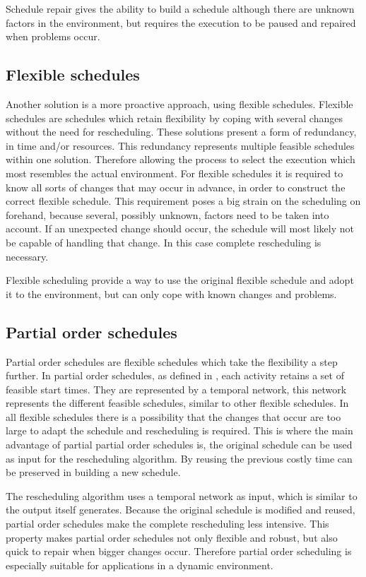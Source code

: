 \documentclass{article}
\begin{document}
Schedule repair gives the ability to build a schedule although there are unknown factors in the environment, but requires the execution to be paused and repaired when problems occur.

\subsection{Flexible schedules}
Another solution is a more proactive approach, using flexible schedules.
Flexible schedules are schedules which retain flexibility by coping with several changes without the need for rescheduling.
These solutions present a form of redundancy, in time and/or resources.
This redundancy represents multiple feasible schedules within one solution.
Therefore allowing the process to select the execution which most resembles the actual environment.
For flexible schedules it is required to know all sorts of changes that may occur in advance, in order to construct the correct flexible schedule.
This requirement poses a big strain on the scheduling on forehand, because several, possibly unknown, factors need to be taken into account.
If an unexpected change should occur, the schedule will most likely not be capable of handling that change.
In this case complete rescheduling is necessary.

Flexible scheduling provide a way to use the original flexible schedule and adopt it to the environment, but can only cope with known changes and problems.

\subsection{Partial order schedules}
Partial order schedules are flexible schedules which take the flexibility a step further.
In partial order schedules, as defined in \citet{policella07}, each activity retains a set of feasible start times.
They are represented by a temporal network, this network represents the different feasible schedules, similar to other flexible schedules.
In all flexible schedules there is a possibility that the changes that occur are too large to adapt the schedule and rescheduling is required.
This is where the main advantage of partial partial order schedules is, the original schedule can be used as input for the rescheduling algorithm.
By reusing the previous costly time can be preserved in building a new schedule.

The rescheduling algorithm uses a temporal network as input, which is similar to the output itself generates.
Because the original schedule is modified and reused, partial order schedules make the complete rescheduling less intensive.
This property makes partial order schedules not only flexible and robust, but also quick to repair when bigger changes occur.
Therefore partial order scheduling is especially suitable for applications in a dynamic environment.
\end{document}
